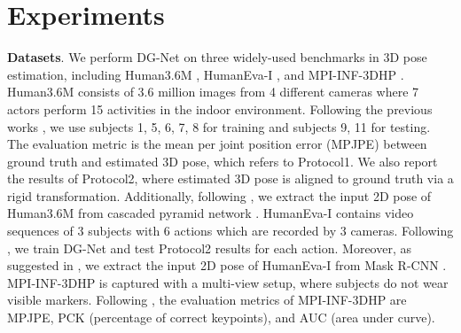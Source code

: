 \documentclass[journal]{IEEEtran}
\begin{document}
\begin{table}[t]
\begin{center}
\end{center}
\caption{SOTA Comparison on MPI-INF-3DHP under PCK, AUC and MPJPE (mm).}
\label{MPI}
\vspace{-0.4cm}
\end{table}




\section{Experiments}

\textbf{Datasets}.
We perform DG-Net on three widely-used benchmarks in 3D pose estimation,
including
Human3.6M \cite{h36m_pami},
HumanEva-I \cite{humaneva},
and
MPI-INF-3DHP \cite{mono_3dhp2017}.
Human3.6M consists of 3.6 million images from 4 different cameras where 7 actors perform 15 activities in the indoor environment.
Following the previous works \cite{pavllo:videopose3d:2019,Ci_2019_ICCV,Cai_2019_ICCV},
we use subjects 1, 5, 6, 7, 8 for training and subjects 9, 11 for testing.
The evaluation metric is the mean per joint position error (MPJPE) between ground truth and estimated 3D pose,
which refers to Protocol1.
We also report the results of Protocol2,
where
estimated 3D pose is aligned to ground truth via a rigid transformation.
Additionally,
following \cite{pavllo:videopose3d:2019},
we extract the input 2D pose of Human3.6M from cascaded pyramid network \cite{cpn}.
HumanEva-I contains video sequences of 3 subjects with 6 actions which are recorded by 3 cameras.
Following \cite{pavllo:videopose3d:2019,simple}, we train DG-Net and test Protocol2 results for each action.
Moreover,
as suggested in \cite{pavllo:videopose3d:2019},
we extract the input 2D pose of HumanEva-I from Mask R-CNN \cite{maskrcnn}. MPI-INF-3DHP is captured with a multi-view setup,
where
subjects do not wear visible markers.
Following \cite{VNect_SIGGRAPH2017},
the evaluation metrics of MPI-INF-3DHP are
MPJPE,
PCK (percentage of correct keypoints),
and
AUC (area under curve).
\end{document}

